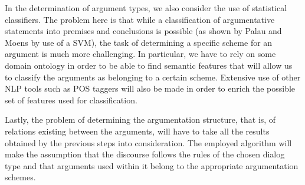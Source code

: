 \documentclass[lnbip]{svmultln}
\begin{document}
\par
In the determination of argument types, we also consider the use of statistical classifiers.
The problem here is that while a classification of argumentative statements into premises and conclusions is possible (as shown by Palau and Moens by use of a SVM), the task of determining a specific scheme for an argument is much more challenging. In particular, we have to rely on some domain ontology in order to be able to find semantic features that will allow us to classify the arguments as belonging to a certain scheme.
Extensive use of other NLP tools such as POS taggers will also be made in order to enrich the possible set of features used for classification.

\par
Lastly, the problem of determining the argumentation structure, that is, of relations existing between the arguments, will have to take all the results obtained by the previous steps into consideration. The employed algorithm will make the assumption that the discourse follows the rules of the chosen dialog type and that arguments used within it belong to the appropriate argumentation schemes.


%
%
%
%
%
%
%
%
%
\end{document}

